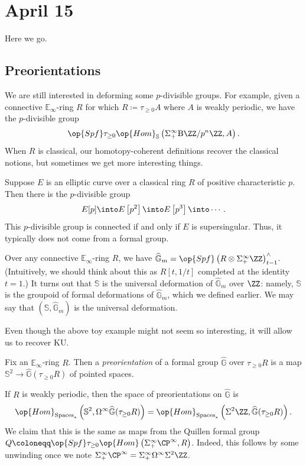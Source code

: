 \documentclass[../notes.tex]{subfiles}
\begin{document}
\section{April 15}
Here we go.

\subsection{Preorientations}
We are still interested in deforming some $p$-divisible groups. For example, given a connective $\mathbb E_\infty$-ring $R$ for which $R\coloneqq\tau_{\ge0}A$ where $A$ is weakly periodic, we have the $p$-divisible group
\[\op{Spf}\tau_{\ge0}\op{Hom}_\mathbb S\left(\Sigma_+^\infty\mathrm B\ZZ/p^n\ZZ,A\right).\]
When $R$ is classical, our homotopy-coherent definitions recover the classical notions, but sometimes we get more interesting things.
\begin{example}
	Suppose $E$ is an elliptic curve over a classical ring $R$ of positive characteristic $p$. Then there is the $p$-divisible group
	\[E[p]\into E\left[p^2\right]\into E\left[p^3\right]\into\cdots.\]
	This $p$-divisible group is connected if and only if $E$ is supersingular. Thus, it typically does not come from a formal group.
\end{example}
\begin{example}
	Over any connective $\mathbb E_\infty$-ring $R$, we have $\widehat{\mathbb G}_m=\op{Spf}\left(R\otimes\Sigma^\infty_+\ZZ\right)^\land_{t-1}$. (Intuitively, we should think about this as $R[t,1/t]$ completed at the identity $t=1$.) It turns out that $\mathbb S$ is the universal deformation of $\widehat{\mathbb G}_m$ over $\ZZ$: namely, $\mathbb S$ is the groupoid of formal deformations of $\widehat{\mathbb G}_m$, which we defined earlier. We may say that $(\mathbb S,\widehat{\mathbb G}_m)$ is the universal deformation.
\end{example}
Even though the above toy example might not seem so interesting, it will allow us to recover $\mathrm{KU}$.
\begin{definition}[preorientation]
	Fix an $\mathbb E_\infty$-ring $R$. Then a \textit{preorientation} of a formal group $\widehat{\mathbb G}$ over $\tau_{\ge0}R$ is a map $\mathbb S^2\to\widehat{\mathbb G}(\tau_{\ge0}R)$ of pointed spaces.
\end{definition}
\begin{remark}
	If $R$ is weakly periodic, then the space of preorientations on $\widehat{\mathbb G}$ is
	\[\op{Hom}_{\mathrm{Spaces}_*}\left(\mathbb S^2,\Omega^\infty\widehat{\mathbb G}(\tau_{\ge0}R)\right)=\op{Hom}_{\mathrm{Spaces}_*}\left(\Sigma^2\ZZ,\widehat{\mathbb G}(\tau_{\ge0}R)\right).\]
	We claim that this is the same as maps from the Quillen formal group $Q\coloneqq\op{Spf}\tau_{\ge0}\op{Hom}\left(\Sigma^\infty_+\CP^\infty,R\right)$. Indeed, this follows by some unwinding once we note $\Sigma_+^\infty\CP^\infty=\Sigma_+^\infty\Omega^\infty\Sigma^2\ZZ$.
\end{remark}
\end{document}
